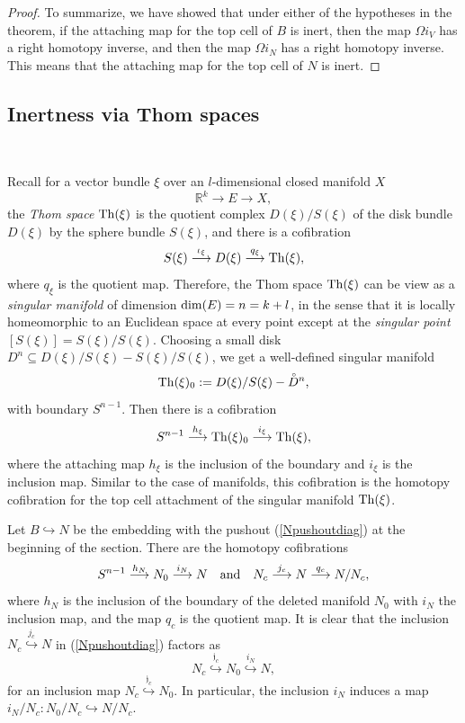 \documentclass[a4]{amsart}
\theoremstyle{definition}
\begin{document}
\begin{sloppypar}
\begin{proof}
To summarize, we have showed that under either of the hypotheses in the theorem, if the attaching map for the top cell of $B$ is inert, then the map $\Omega i_V$ has a right homotopy inverse, and then the map $\Omega i_N$ has a right homotopy inverse. This means that the attaching map for the top cell of $N$ is inert. 
\end{proof}

\subsection{Inertness via Thom spaces}
\label{subsec: Thom}

$\, $

Recall for a vector bundle $\xi$ over an $l$-dimensional closed manifold $X$
\[
\mathbb{R}^k\stackrel{}{\longrightarrow} E\stackrel{}{\longrightarrow} X,
\]
the {\it Thom space ${\rm Th}(\xi)$} is the quotient complex $D(\xi)/S(\xi)$ of the disk bundle $D(\xi)$ by the sphere bundle $S(\xi)$, and there is a cofibration
\[
S(\xi)\stackrel{\iota_\xi}{\longrightarrow} D(\xi)\stackrel{q_\xi}{\longrightarrow} {\rm Th}(\xi),
\] 
where $q_\xi$ is the quotient map. 
Therefore, the Thom space ${\rm Th}(\xi)$ can be view as a {\it singular manifold} of dimension ${\rm dim}(E)=n=k+l$, in the sense that it is locally homeomorphic to an Euclidean space at every point except at the {\it singular point} $[S(\xi)]=S(\xi)/S(\xi)$. Choosing a small disk $D^{n}\subseteq D(\xi)/S(\xi)-S(\xi)/S(\xi)$, we get a well-defined singular manifold 
\[
{\rm Th}(\xi)_0:=D(\xi)/S(\xi)-\accentset{\circ}{D}^{n},
\]
with boundary $S^{n-1}$. Then there is a cofibration
\[
S^{n-1}\stackrel{h_\xi}{\longrightarrow} {\rm Th}(\xi)_0\stackrel{i_\xi}{\longrightarrow} {\rm Th}(\xi),
\]
where the attaching map $h_\xi$ is the inclusion of the boundary and $i_\xi$ is the inclusion map. Similar to the case of manifolds, this cofibration is the homotopy cofibration for the top cell attachment of the singular manifold ${\rm Th}(\xi)$. 

Let $B\stackrel{}{\hookrightarrow}N$ be the embedding with the pushout (\ref{Npushoutdiag}) at the beginning of the section. There are the homotopy cofibrations
\[
S^{n-1}\stackrel{h_N}{\longrightarrow} N_0\stackrel{i_N}{\longrightarrow} N \ \ \ {\rm and} \ \ \ 
N_c \stackrel{j_c}{\longrightarrow} N\stackrel{q_c}{\longrightarrow} N/N_c, 
\]
where $h_N$ is the inclusion of the boundary of the deleted manifold $N_0$ with $i_N$ the  inclusion map, and the map $q_c$ is the quotient map. 
It is clear that the inclusion $N_c\stackrel{j_c}{\hookrightarrow} N$ in (\ref{Npushoutdiag}) factors as
\begin{equation}\label{NcN0Neq}
N_c\stackrel{\mathfrak{j}_c}{\hookrightarrow} N_0\stackrel{i_N}{\hookrightarrow} N,
\end{equation}
for an inclusion map $N_c\stackrel{\mathfrak{j}_c}{\hookrightarrow} N_0$. In particular, the inclusion $i_N$ induces a map $i_N/N_c: N_0/N_c \stackrel{}{\hookrightarrow} N/N_c$.


\end{sloppypar}
\end{document}
